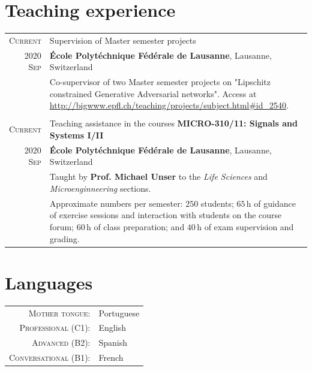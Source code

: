 \documentclass[a4paper,11pt]{article}
\begin{document}
  \section{Teaching experience}

    \begin{tabular}{r|p{13cm}}

      \textsc{Current}	 & Supervision of Master semester projects \\
      \textsc{2020 Sep}  & \footnotesize{\textbf{École Polytéchnique Fédérale de Lausanne}, Lausanne, Switzerland} \\
      & \footnotesize{Co-supervisor of two Master semester projects on "Lipschitz constrained Generative Adversarial networks". Access at \url{http://bigwww.epfl.ch/teaching/projects/subject.html#id_2540}.} \\
      \multicolumn{2}{c}{} \\

	  \textsc{Current}     & Teaching assistance in the courses \textbf{MICRO-310/11: Signals and Systems I/II} \\
	  \textsc{2020 Sep} & \footnotesize{\textbf{École Polytéchnique Fédérale de Lausanne}, Lausanne, Switzerland} \\
    & \footnotesize{Taught by \textbf{Prof. Michael Unser} to the \emph{Life Sciences} and \emph{Microenginneering} sections.} \\
    & \footnotesize{Approximate numbers per semester:
              $250$ students;
              $65\,\mathrm{h}$ of guidance of exercise sessions and interaction with students on the course forum;
              $60\,\mathrm{h}$ of class preparation; and
							$40\,\mathrm{h}$ of exam supervision and grading.
              } \\

    \end{tabular}


    \vspace{25pt}

    \section{Languages}

      \begin{tabular}{rp{10cm}}

        \textsc{Mother tongue:} & Portuguese \\

        \textsc{Professional (C1):} & English \\

        \textsc{Advanced (B2):} & Spanish \\

        \textsc{Conversational (B1):} & French \\

      \end{tabular}
\end{document}
